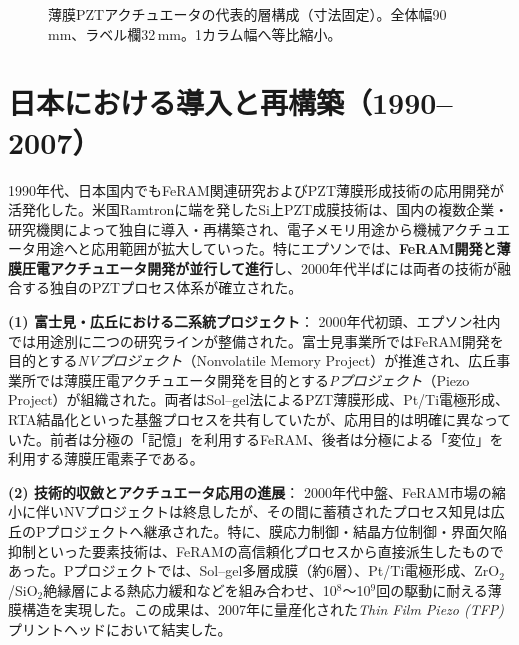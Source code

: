 \documentclass[conference]{IEEEtran}
\begin{document}
\begin{figure}[!t]
{%
}
\caption{薄膜PZTアクチュエータの代表的層構成（寸法固定）。全体幅90\,mm、ラベル欄32\,mm。1カラム幅へ等比縮小。}
\label{fig:stack}
\end{figure}

\section{日本における導入と再構築（1990--2007）}
1990年代、日本国内でもFeRAM関連研究およびPZT薄膜形成技術の応用開発が活発化した。米国Ramtronに端を発したSi上PZT成膜技術は、国内の複数企業・研究機関によって独自に導入・再構築され、電子メモリ用途から機械アクチュエータ用途へと応用範囲が拡大していった。特にエプソンでは、\textbf{FeRAM開発と薄膜圧電アクチュエータ開発が並行して進行}し、2000年代半ばには両者の技術が融合する独自のPZTプロセス体系が確立された。

\medskip
\noindent
\textbf{(1) 富士見・広丘における二系統プロジェクト}：
2000年代初頭、エプソン社内では用途別に二つの研究ラインが整備された。富士見事業所ではFeRAM開発を目的とする\textit{NVプロジェクト}（Nonvolatile Memory Project）が推進され、広丘事業所では薄膜圧電アクチュエータ開発を目的とする\textit{Pプロジェクト}（Piezo Project）が組織された。両者はSol--gel法によるPZT薄膜形成、Pt/Ti電極形成、RTA結晶化といった基盤プロセスを共有していたが、応用目的は明確に異なっていた。前者は分極の「記憶」を利用するFeRAM、後者は分極による「変位」を利用する薄膜圧電素子である。

\medskip
\noindent
\textbf{(2) 技術的収斂とアクチュエータ応用の進展}：
2000年代中盤、FeRAM市場の縮小に伴いNVプロジェクトは終息したが、その間に蓄積されたプロセス知見は広丘のPプロジェクトへ継承された。特に、膜応力制御・結晶方位制御・界面欠陥抑制といった要素技術は、FeRAMの高信頼化プロセスから直接派生したものであった。Pプロジェクトでは、Sol--gel多層成膜（約6層）、Pt/Ti電極形成、ZrO$_2$/SiO$_2$絶縁層による熱応力緩和などを組み合わせ、10$^8$～10$^9$回の駆動に耐える薄膜構造を実現した。この成果は、2007年に量産化された\textit{Thin Film Piezo (TFP)}プリントヘッドにおいて結実した。
\end{document}
